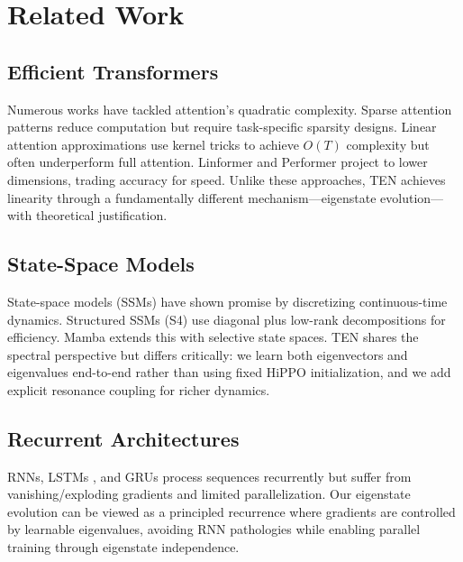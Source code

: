 \documentclass[11pt,letterpaper]{article}
\begin{document}
\section{Related Work}

\subsection{Efficient Transformers}

Numerous works have tackled attention's quadratic complexity. Sparse attention patterns \cite{child2019generating,beltagy2020longformer} reduce computation but require task-specific sparsity designs. Linear attention approximations \cite{katharopoulos2020transformers,choromanski2020rethinking} use kernel tricks to achieve $O(T)$ complexity but often underperform full attention. Linformer \cite{wang2020linformer} and Performer \cite{choromanski2020rethinking} project to lower dimensions, trading accuracy for speed. Unlike these approaches, TEN achieves linearity through a fundamentally different mechanism—eigenstate evolution—with theoretical justification.

\subsection{State-Space Models}

State-space models (SSMs) \cite{gu2021efficiently,gu2021combining} have shown promise by discretizing continuous-time dynamics. Structured SSMs (S4) \cite{gu2021efficiently} use diagonal plus low-rank decompositions for efficiency. Mamba \cite{gu2023mamba} extends this with selective state spaces. TEN shares the spectral perspective but differs critically: we learn both eigenvectors and eigenvalues end-to-end rather than using fixed HiPPO initialization, and we add explicit resonance coupling for richer dynamics.

\subsection{Recurrent Architectures}

RNNs, LSTMs \cite{hochreiter1997long}, and GRUs \cite{cho2014learning} process sequences recurrently but suffer from vanishing/exploding gradients and limited parallelization. Our eigenstate evolution can be viewed as a principled recurrence where gradients are controlled by learnable eigenvalues, avoiding RNN pathologies while enabling parallel training through eigenstate independence.
\end{document}
